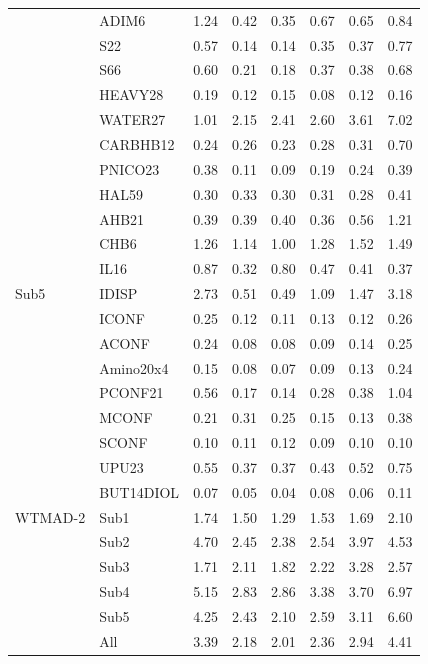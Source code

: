 \begin{longtable}{ll:d{2.2}d{2.2}d{2.2}:d{2.2}d{2.2}d{2.2}}
          & ADIM6     & 1.24  & 0.42  & 0.35  & 0.67   & 0.65  & 0.84  \\
          & S22       & 0.57  & 0.14  & 0.14  & 0.35   & 0.37  & 0.77  \\
          & S66       & 0.60  & 0.21  & 0.18  & 0.37   & 0.38  & 0.68  \\
          & HEAVY28   & 0.19  & 0.12  & 0.15  & 0.08   & 0.12  & 0.16  \\
          & WATER27   & 1.01  & 2.15  & 2.41  & 2.60   & 3.61  & 7.02  \\
          & CARBHB12  & 0.24  & 0.26  & 0.23  & 0.28   & 0.31  & 0.70  \\
          & PNICO23   & 0.38  & 0.11  & 0.09  & 0.19   & 0.24  & 0.39  \\
          & HAL59     & 0.30  & 0.33  & 0.30  & 0.31   & 0.28  & 0.41  \\
          & AHB21     & 0.39  & 0.39  & 0.40  & 0.36   & 0.56  & 1.21  \\
          & CHB6      & 1.26  & 1.14  & 1.00  & 1.28   & 1.52  & 1.49  \\
          & IL16      & 0.87  & 0.32  & 0.80  & 0.47   & 0.41  & 0.37  \\ \hdashline
  Sub5    & IDISP     & 2.73  & 0.51  & 0.49  & 1.09   & 1.47  & 3.18  \\
          & ICONF     & 0.25  & 0.12  & 0.11  & 0.13   & 0.12  & 0.26  \\
          & ACONF     & 0.24  & 0.08  & 0.08  & 0.09   & 0.14  & 0.25  \\
          & Amino20x4 & 0.15  & 0.08  & 0.07  & 0.09   & 0.13  & 0.24  \\
          & PCONF21   & 0.56  & 0.17  & 0.14  & 0.28   & 0.38  & 1.04  \\
          & MCONF     & 0.21  & 0.31  & 0.25  & 0.15   & 0.13  & 0.38  \\
          & SCONF     & 0.10  & 0.11  & 0.12  & 0.09   & 0.10  & 0.10  \\
          & UPU23     & 0.55  & 0.37  & 0.37  & 0.43   & 0.52  & 0.75  \\
          & BUT14DIOL & 0.07  & 0.05  & 0.04  & 0.08   & 0.06  & 0.11  \\ \hline
  WTMAD-2 & Sub1      & 1.74  & 1.50  & 1.29  & 1.53   & 1.69  & 2.10  \\
          & Sub2      & 4.70  & 2.45  & 2.38  & 2.54   & 3.97  & 4.53  \\
          & Sub3      & 1.71  & 2.11  & 1.82  & 2.22   & 3.28  & 2.57  \\
          & Sub4      & 5.15  & 2.83  & 2.86  & 3.38   & 3.70  & 6.97  \\
          & Sub5      & 4.25  & 2.43  & 2.10  & 2.59   & 3.11  & 6.60  \\
          & All       & 3.39  & 2.18  & 2.01  & 2.36   & 2.94  & 4.41  \\ \hline
  \end{longtable}

